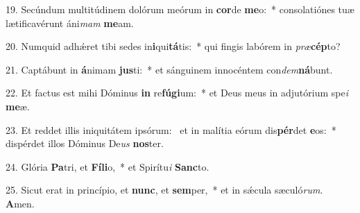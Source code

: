 19. Secúndum multitúdinem dolórum meórum in \textbf{cor}de \textbf{me}o:~*  consolatiónes tuæ lætificavérunt áni\textit{mam} \textbf{me}am.\

20. Numquid adhǽret tibi sedes in\textbf{i}qui\textbf{tá}tis:~*  qui fingis labórem in \textit{præ}\textbf{cép}to?\

21. Captábunt in \textbf{á}nimam \textbf{jus}ti:~*  et sánguinem innocéntem con\textit{dem}\textbf{ná}bunt.\

22. Et factus est mihi Dóminus \textbf{in} re\textbf{fú}\textbf{gi}um:~*  et Deus meus in adjutórium spe\textit{i} \textbf{me}æ.\

23. Et reddet illis iniquitátem ipsórum: \dag\  et in malítia eórum dis\textbf{pér}det \textbf{e}os:~*  dispérdet illos Dóminus De\textit{us} \textbf{nos}ter.\

24. Glória \textbf{Pa}tri, et \textbf{Fí}\textbf{li}o,~*  et Spirítu\textit{i} \textbf{Sanc}to.\

25. Sicut erat in princípio, et \textbf{nunc}, et \textbf{sem}per,~*  et in sǽcula sæculó\textit{rum}. \textbf{A}men.\

